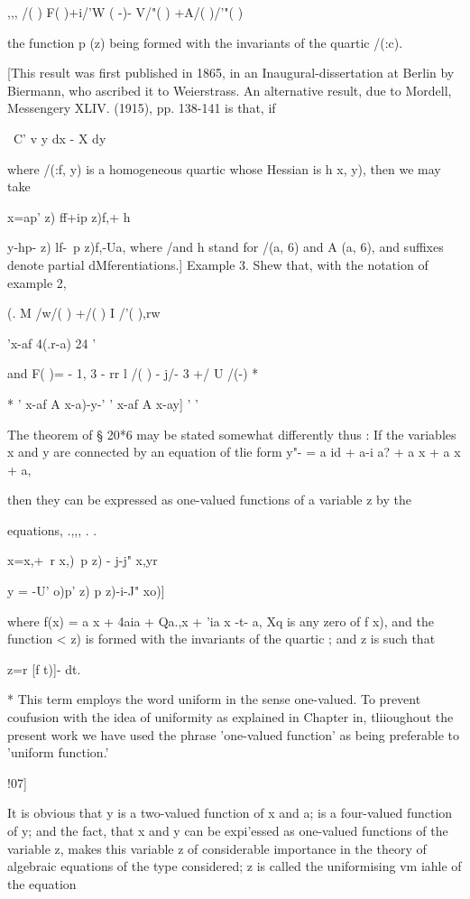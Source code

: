 {,,, /( ) F( )+i/'W ( -)- V/"( ) +A/( )/'"( )

the function p (z) being formed with the invariants of the quartic
/(:c).


[This result was first published in 1865, in an Inaugural-dissertation
at Berlin by Biermann, who ascribed it to Weierstrass. An alternative
result, due to Mordell, Messengery XLIV. (1915), pp. 138-141 is that,
if

\ C' v y dx - X dy

where /(:f, y) is a homogeneous quartic whose Hessian is h x, y), then
we may take

x=ap' z) ff+ip z)f,+ h

y-hp- z) lf-\ p z)f,-Ua, where /and h stand for /(a, 6) and A (a, 6),
and suffixes denote partial dMferentiations.] Example 3. Shew that,
with the notation of example 2,

(. M /w/( ) +/( ) I /'( ),rw

 'x-af 4(.r-a) 24 '

and F( )= - 1, 3 - rr l /( ) - j/- 3 +/ U /(-) *

* ' x-af A x-a)-y-' ' x-af A x-ay] ' '

The theorem of §
20*6 may be stated somewhat differently thus : If the variables x and
y are connected by an equation of tlie form y"- = a id + a-i a? + a x
+ a x + a,

then they can be expressed as one-valued functions of a variable z by
the

equations, .,,, . .

  x=x,+\ r x,)\ p z) - j-j" x,yr

y = -U' o)p' z) p z)-i-J" xo)]

where f(x) = a x + 4aia + Qa.,x + 'ia x -t- a, Xq is any zero of f
x), and the function < z) is formed with the invariants of the quartic
; and z is such that

z=r [f t)]- dt.

* This term employs the word uniform in the sense one-valued. To
prevent coufusion with the idea of uniformity as explained in Chapter
in, tliioughout the present work we have used the phrase 'one-valued
function' as being preferable to 'uniform function.'

!07]

%
%

It is obvious that y is a two-valued function of x and a; is a
four-valued function of y; and the fact, that x and y can be
expi'essed as one-valued functions of the variable z, makes this
variable z of considerable importance in the theory of algebraic
equations of the type considered; z is called the uniformising vm
iahle of the equation

}
